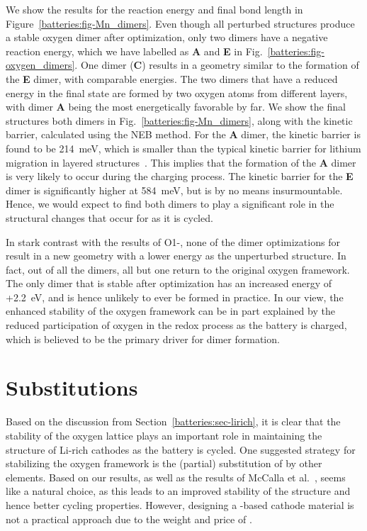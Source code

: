 \begin{refsection}
We show the results for the reaction energy and final bond length in 
Figure~\ref{batteries:fig-Mn_dimers}. Even though all perturbed structures 
produce a stable oxygen dimer after optimization, only two dimers have a 
negative reaction energy, which we have labelled as \textbf{A} and \textbf{E} 
in Fig.~\ref{batteries:fig-oxygen_dimers}. One dimer (\textbf{C}) results in a 
geometry similar to the formation of the \textbf{E} dimer, with comparable 
energies. The two dimers that have a reduced energy in the final state are 
formed by two oxygen atoms from different layers, with dimer \textbf{A} being 
the most energetically favorable by far. We show the final structures both 
dimers in Fig.~\ref{batteries:fig-Mn_dimers}, along with the kinetic barrier, 
calculated using the NEB method. For the \textbf{A} dimer, the kinetic barrier 
is found to be 214~\si{\milli\electronvolt}, which is smaller than the typical 
kinetic barrier for lithium migration in layered 
structures~\cite{VanDerVen2013}. This implies that the formation of the 
\textbf{A} dimer is very likely to occur during the charging process. The 
kinetic barrier for the \textbf{E} dimer is significantly higher at 
584~\si{\milli\electronvolt}, but is by no means insurmountable. Hence, we 
would expect to find both dimers to play a significant role in the structural 
changes that occur for  as it is cycled. 
 
In stark contrast with the results of O1-, none of the dimer 
optimizations for  result in a new geometry with a lower 
energy as the unperturbed structure. In fact, out of all the dimers, all but 
one return to the original oxygen framework. The only dimer that is stable 
after optimization has an increased energy of +2.2~\si{\electronvolt}, and is 
hence unlikely to ever be formed in practice. In our view, the enhanced 
stability of the oxygen framework can be in part explained by the reduced 
participation of oxygen in the redox process as the battery is charged, which 
is believed to be the primary driver for dimer formation. 
 
\section{Substitutions} \label{batteries:sec-substitutions} 
 
Based on the discussion from Section~\ref{batteries:sec-lirich}, it is clear 
that the stability of the oxygen lattice plays an important role in 
maintaining the structure of Li-rich cathodes as the battery is cycled. One 
suggested strategy for stabilizing the oxygen framework is the (partial) 
substitution of  by other elements. Based on our results, as well 
as the results of McCalla et al.~\cite{McCalla2015},  seems like a 
natural choice, as this leads to an improved stability of the structure and 
hence better cycling properties. However, designing a -based cathode 
material is not a practical approach due to the weight and price of . 
 

\end{refsection}
